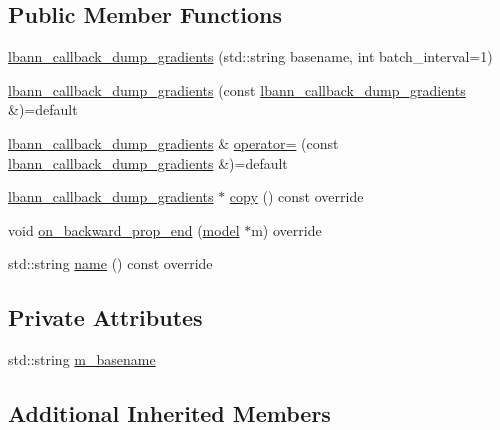 \subsection*{Public Member Functions}
\begin{DoxyCompactItemize}
\item 
\hyperlink{classlbann_1_1lbann__callback__dump__gradients_a321a8f673578f3a0535b9f8e27e3517a}{lbann\+\_\+callback\+\_\+dump\+\_\+gradients} (std\+::string basename, int batch\+\_\+interval=1)
\item 
\hyperlink{classlbann_1_1lbann__callback__dump__gradients_a71dd307db6a16c35a336ee57a5cab656}{lbann\+\_\+callback\+\_\+dump\+\_\+gradients} (const \hyperlink{classlbann_1_1lbann__callback__dump__gradients}{lbann\+\_\+callback\+\_\+dump\+\_\+gradients} \&)=default
\item 
\hyperlink{classlbann_1_1lbann__callback__dump__gradients}{lbann\+\_\+callback\+\_\+dump\+\_\+gradients} \& \hyperlink{classlbann_1_1lbann__callback__dump__gradients_a31986866a3865159eb1680e5affba1f1}{operator=} (const \hyperlink{classlbann_1_1lbann__callback__dump__gradients}{lbann\+\_\+callback\+\_\+dump\+\_\+gradients} \&)=default
\item 
\hyperlink{classlbann_1_1lbann__callback__dump__gradients}{lbann\+\_\+callback\+\_\+dump\+\_\+gradients} $\ast$ \hyperlink{classlbann_1_1lbann__callback__dump__gradients_a16b659f1d7e313c02a840be5173ebb38}{copy} () const override
\item 
void \hyperlink{classlbann_1_1lbann__callback__dump__gradients_a2485599f66842eda62c8bc8d4d44ef02}{on\+\_\+backward\+\_\+prop\+\_\+end} (\hyperlink{classlbann_1_1model}{model} $\ast$m) override
\item 
std\+::string \hyperlink{classlbann_1_1lbann__callback__dump__gradients_ae66a46b4835233c0a08c1fcc2fc9710d}{name} () const override
\end{DoxyCompactItemize}
\subsection*{Private Attributes}
\begin{DoxyCompactItemize}
\item 
std\+::string \hyperlink{classlbann_1_1lbann__callback__dump__gradients_a5c8236660ca8b1cb61dddcd1264821ca}{m\+\_\+basename}
\end{DoxyCompactItemize}
\subsection*{Additional Inherited Members}


